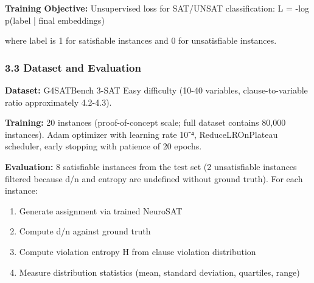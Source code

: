 \textbf{Training Objective:} Unsupervised loss for SAT/UNSAT classification:
L = -log p(label | final embeddings)

where label is 1 for satisfiable instances and 0 for unsatisfiable instances.

\subsubsection{3.3 Dataset and Evaluation}

\textbf{Dataset:} G4SATBench 3-SAT Easy difficulty (10-40 variables, clause-to-variable ratio approximately 4.2-4.3).

\textbf{Training:} 20 instances (proof-of-concept scale; full dataset contains 80,000 instances). Adam optimizer with learning rate 10⁻⁴, ReduceLROnPlateau scheduler, early stopping with patience of 20 epochs.

\textbf{Evaluation:} 8 satisfiable instances from the test set (2 unsatisfiable instances filtered because d/n and entropy are undefined without ground truth). For each instance:
\begin{enumerate}
\item Generate assignment via trained NeuroSAT
\item Compute d/n against ground truth
\item Compute violation entropy H from clause violation distribution
\item Measure distribution statistics (mean, standard deviation, quartiles, range)
\end{enumerate}
